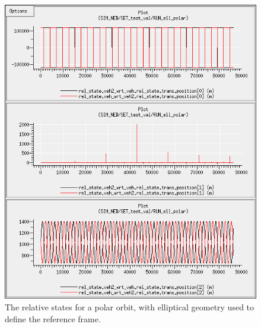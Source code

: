 \begin{description}
\begin{enumerate}
\begin{figure}[!ht]
\begin{center}
\includegraphics[width=5in]{figures/ned_polar_ell.jpg}
\caption{The relative states for a polar orbit, with elliptical geometry used to define the reference frame.}
\label{fig:nedpolarell}
\end{center}
\end{figure}


\end{enumerate}
\end{description}
